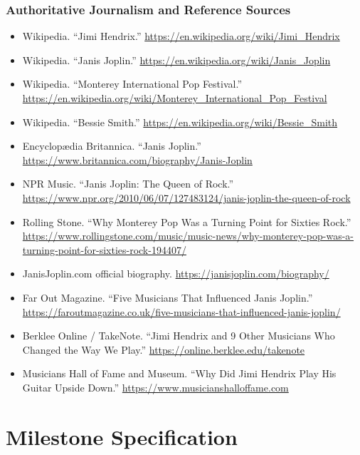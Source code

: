 \documentclass[11pt,letterpaper]{article}
\newcommand{\stageheader}[2]{%
  \noindent\colorbox{#2}{\makebox[\textwidth][l]{%
    \textcolor{white}{\bfseries\sffamily\hspace{6pt}#1\hspace{6pt}}}}%
  \vspace{0.5em}\par%
}
\begin{document}
\subsubsection{Authoritative Journalism and Reference Sources}
\begin{itemize}[leftmargin=*]
  \item Wikipedia. ``Jimi Hendrix.'' \url{https://en.wikipedia.org/wiki/Jimi_Hendrix}
  \item Wikipedia. ``Janis Joplin.'' \url{https://en.wikipedia.org/wiki/Janis_Joplin}
  \item Wikipedia. ``Monterey International Pop Festival.'' \url{https://en.wikipedia.org/wiki/Monterey_International_Pop_Festival}
  \item Wikipedia. ``Bessie Smith.'' \url{https://en.wikipedia.org/wiki/Bessie_Smith}
  \item Encyclop\ae dia Britannica. ``Janis Joplin.'' \url{https://www.britannica.com/biography/Janis-Joplin}
  \item NPR Music. ``Janis Joplin: The Queen of Rock.'' \url{https://www.npr.org/2010/06/07/127483124/janis-joplin-the-queen-of-rock}
  \item Rolling Stone. ``Why Monterey Pop Was a Turning Point for Sixties Rock.'' \url{https://www.rollingstone.com/music/music-news/why-monterey-pop-was-a-turning-point-for-sixties-rock-194407/}
  \item JanisJoplin.com official biography. \url{https://janisjoplin.com/biography/}
  \item Far Out Magazine. ``Five Musicians That Influenced Janis Joplin.'' \url{https://faroutmagazine.co.uk/five-musicians-that-influenced-janis-joplin/}
  \item Berklee Online / TakeNote. ``Jimi Hendrix and 9 Other Musicians Who Changed the Way We Play.'' \url{https://online.berklee.edu/takenote}
  \item Musicians Hall of Fame and Museum. ``Why Did Jimi Hendrix Play His Guitar Upside Down.'' \url{https://www.musicianshalloffame.com}
\end{itemize}

\newpage

\stageheader{STAGE 3 --- MISSION PACKAGE}{tertiary}

\section{Milestone Specification}
\end{document}
